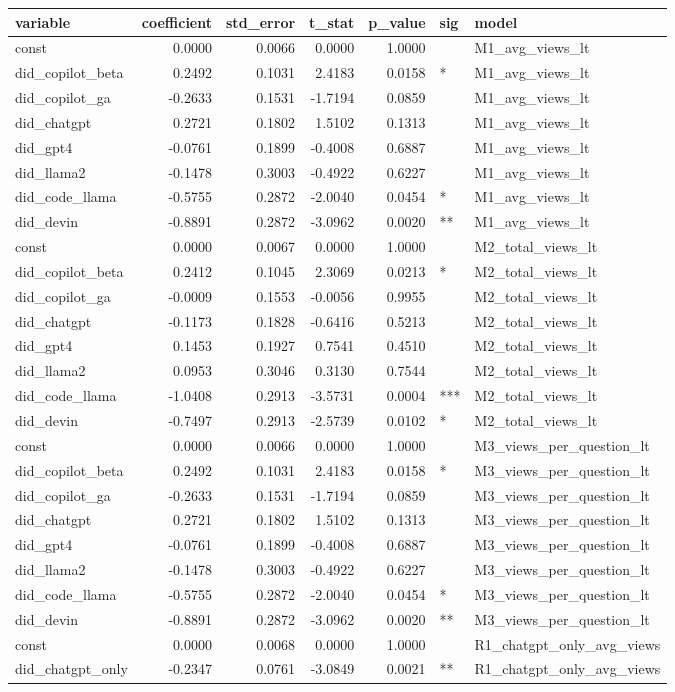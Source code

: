 \begin{tabular}{lrrrrll}
\toprule
variable & coefficient & std_error & t_stat & p_value & sig & model \\
\midrule
const & 0.0000 & 0.0066 & 0.0000 & 1.0000 &  & M1_avg_views_lt \\
did_copilot_beta & 0.2492 & 0.1031 & 2.4183 & 0.0158 & * & M1_avg_views_lt \\
did_copilot_ga & -0.2633 & 0.1531 & -1.7194 & 0.0859 &  & M1_avg_views_lt \\
did_chatgpt & 0.2721 & 0.1802 & 1.5102 & 0.1313 &  & M1_avg_views_lt \\
did_gpt4 & -0.0761 & 0.1899 & -0.4008 & 0.6887 &  & M1_avg_views_lt \\
did_llama2 & -0.1478 & 0.3003 & -0.4922 & 0.6227 &  & M1_avg_views_lt \\
did_code_llama & -0.5755 & 0.2872 & -2.0040 & 0.0454 & * & M1_avg_views_lt \\
did_devin & -0.8891 & 0.2872 & -3.0962 & 0.0020 & ** & M1_avg_views_lt \\
const & 0.0000 & 0.0067 & 0.0000 & 1.0000 &  & M2_total_views_lt \\
did_copilot_beta & 0.2412 & 0.1045 & 2.3069 & 0.0213 & * & M2_total_views_lt \\
did_copilot_ga & -0.0009 & 0.1553 & -0.0056 & 0.9955 &  & M2_total_views_lt \\
did_chatgpt & -0.1173 & 0.1828 & -0.6416 & 0.5213 &  & M2_total_views_lt \\
did_gpt4 & 0.1453 & 0.1927 & 0.7541 & 0.4510 &  & M2_total_views_lt \\
did_llama2 & 0.0953 & 0.3046 & 0.3130 & 0.7544 &  & M2_total_views_lt \\
did_code_llama & -1.0408 & 0.2913 & -3.5731 & 0.0004 & *** & M2_total_views_lt \\
did_devin & -0.7497 & 0.2913 & -2.5739 & 0.0102 & * & M2_total_views_lt \\
const & 0.0000 & 0.0066 & 0.0000 & 1.0000 &  & M3_views_per_question_lt \\
did_copilot_beta & 0.2492 & 0.1031 & 2.4183 & 0.0158 & * & M3_views_per_question_lt \\
did_copilot_ga & -0.2633 & 0.1531 & -1.7194 & 0.0859 &  & M3_views_per_question_lt \\
did_chatgpt & 0.2721 & 0.1802 & 1.5102 & 0.1313 &  & M3_views_per_question_lt \\
did_gpt4 & -0.0761 & 0.1899 & -0.4008 & 0.6887 &  & M3_views_per_question_lt \\
did_llama2 & -0.1478 & 0.3003 & -0.4922 & 0.6227 &  & M3_views_per_question_lt \\
did_code_llama & -0.5755 & 0.2872 & -2.0040 & 0.0454 & * & M3_views_per_question_lt \\
did_devin & -0.8891 & 0.2872 & -3.0962 & 0.0020 & ** & M3_views_per_question_lt \\
const & 0.0000 & 0.0068 & 0.0000 & 1.0000 &  & R1_chatgpt_only_avg_views \\
did_chatgpt_only & -0.2347 & 0.0761 & -3.0849 & 0.0021 & ** & R1_chatgpt_only_avg_views \\
\bottomrule
\end{tabular}
